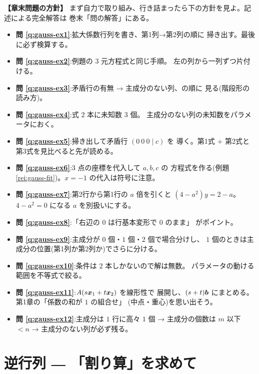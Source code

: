 \bigskip
{\small
\noindent\textbf{【章末問題の方針】}\quad
まず自力で取り組み、行き詰まったら下の方針を見よ。記述による完全解答は
巻末「問の解答」にある。
\begin{itemize}
\item \textbf{問 \ref{q:gauss-ex1}}:拡大係数行列を書き、第1列→第2列の順に
掃き出す。最後に必ず検算する。
\item \textbf{問 \ref{q:gauss-ex2}}:例題の $3$ 元方程式と同じ手順。
左の列から一列ずつ片付ける。
\item \textbf{問 \ref{q:gauss-ex3}}:矛盾行の有無 → 主成分のない列、の順に
見る(階段形の読み方)。
\item \textbf{問 \ref{q:gauss-ex4}}:式 $2$ 本に未知数 $3$ 個。
主成分のない列の未知数をパラメータにおく。
\item \textbf{問 \ref{q:gauss-ex5}}:掃き出して矛盾行 $(0\ 0\ 0 \mid c)$ を
導く。第1式 $+$ 第2式と第3式を見比べると先が読める。
\item \textbf{問 \ref{q:gauss-ex6}}:$3$ 点の座標を代入して $a, b, c$ の
方程式を作る(例題 \ref{rei:gauss-fit})。$x = -1$ の代入は符号に注意。
\item \textbf{問 \ref{q:gauss-ex7}}:第2行から第1行の $a$ 倍を引くと
$(4 - a^2)y = 2 - a$。$4 - a^2 = 0$ になる $a$ を別扱いにする。
\item \textbf{問 \ref{q:gauss-ex8}}:「右辺の $0$ は行基本変形で $0$ のまま」
がポイント。
\item \textbf{問 \ref{q:gauss-ex9}}:主成分が $0$ 個・$1$ 個・$2$ 個で場合分けし、
$1$ 個のときは主成分の位置(第1列か第2列か)でさらに分ける。
\item \textbf{問 \ref{q:gauss-ex10}}:条件は $2$ 本しかないので解は無数。
パラメータの動ける範囲を不等式で絞る。
\item \textbf{問 \ref{q:gauss-ex11}}:$A(s\bm{x}_1 + t\bm{x}_2)$ を線形性で
展開し、$(s + t)\bm{b}$ にまとめる。第1章の「係数の和が $1$ の組合せ」
(中点・重心)を思い出そう。
\item \textbf{問 \ref{q:gauss-ex12}}:主成分は $1$ 行に高々 $1$ 個
→ 主成分の個数は $m$ 以下 $< n$ → 主成分のない列が必ず残る。
\end{itemize}
}

\chapter{逆行列 ― 「割り算」を求めて}\label{chap:inverse}

